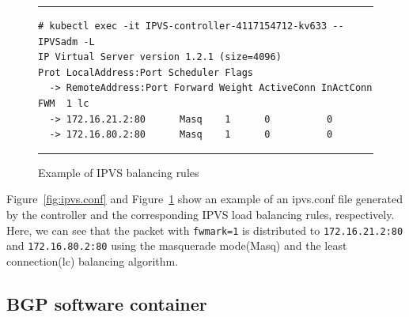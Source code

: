 \begin{figure}
  \centering
\rule{\columnwidth}{0.4pt}
\begin{verbatim}
# kubectl exec -it IPVS-controller-4117154712-kv633 -- IPVSadm -L
IP Virtual Server version 1.2.1 (size=4096)
Prot LocalAddress:Port Scheduler Flags
  -> RemoteAddress:Port Forward Weight ActiveConn InActConn
FWM  1 lc
  -> 172.16.21.2:80      Masq    1      0          0         
  -> 172.16.80.2:80      Masq    1      0          0
\end{verbatim}
\rule{\columnwidth}{0.4pt}
\caption{Example of IPVS balancing rules}
\label{fig:IPVS rule}
\end{figure}


Figure~\ref{fig:ipvs.conf} and Figure~\ref{fig:IPVS rule} show an example of an ipvs.conf file 
generated by the controller and the corresponding IPVS load balancing rules, respectively.
Here, we can see that the packet with {\tt fwmark=1}\cite{BertHubert2002} is distributed 
to {\tt 172.16.21.2:80} and {\tt 172.16.80.2:80} 
using the masquerade mode(Masq) and 
the least connection(lc)\cite{Zhang2000} balancing algorithm.


\subsection{BGP software container}\label{sec:bgp}

